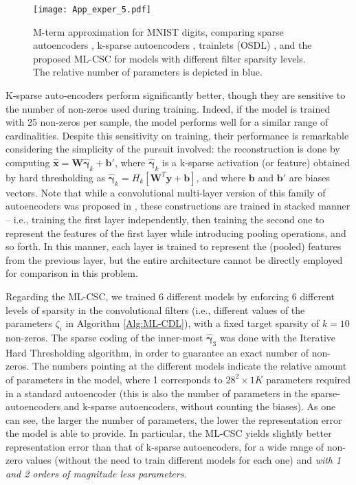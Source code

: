 \documentclass[10pt,journal]{IEEEtran}
\def\x{{\mathbf x}}
\def\y{{\mathbf y}}
\def\W{{\mathbf W}}
\def\b{{\mathbf b}}
\def\gama{{\boldsymbol \gamma}}
\theoremstyle{plain}
\theoremstyle{definition}
\begin{document}
\begin{figure}
	\begin{center}
		\texttt{[image: App\_exper\_5.pdf]}
		\caption{M-term approximation for MNIST digits, comparing sparse autoencoders \cite{ng2011sparse}, k-sparse autoencoders \cite{makhzani2013k}, trainlets (OSDL) \cite{Sulam2016}, and the proposed ML-CSC for models with different filter sparsity levels. The relative number of parameters is depicted in blue. }
		\label{fig:MtermApp}
	\end{center}
\end{figure}

K-sparse auto-encoders perform significantly better, though they are sensitive to the number of non-zeros used during training. Indeed, if the model is trained with 25 non-zeros per sample, the model performs well for a similar range of cardinalities. Despite this sensitivity on training, their performance is remarkable considering the simplicity of the pursuit involved: the reconstruction is done by computing $\hat{\x} = \W\hat{\gama}_k+\b'$, where $\hat{\gama}_k$ is a k-sparse activation (or feature) obtained by hard thresholding as $\hat{\gama}_k = H_k\left[ \W^T\y + \b \right]$, and where $\b$ and $\b'$ are biases vectors. Note that while a convolutional multi-layer version of this family of autoencoders was proposed in \cite{makhzani2015winner}, these constructions are trained in stacked manner -- i.e., training the first layer independently, then training the second one to represent the features of the first layer while introducing pooling operations, and so forth. In this manner, each layer is trained to represent the (pooled) features from the previous layer, but the entire architecture cannot be directly employed for comparison in this problem.

Regarding the ML-CSC, we trained 6 different models by enforcing 6 different levels of sparsity in the convolutional filters (i.e., different values of the parameters $\zeta_i$ in Algorithm \ref{Alg:ML-CDL}), with a fixed target sparsity of $k=10$ non-zeros. The sparse coding of the inner-most $\hat{\gama}_3$ was done with the Iterative Hard Thresholding algorithm, in order to guarantee an exact number of non-zeros. The numbers pointing at the different models indicate the relative amount of parameters in the model, where 1 corresponds to $28^2\times 1K$ parameters required in a standard autoencoder (this is also the number of parameters in the sparse-autoencoders and k-sparse autoencoders, without counting the biases). As one can see, the larger the number of parameters, the lower the representation error the model is able to provide. In particular, the ML-CSC yields slightly better representation error than that of k-sparse autoencoders, for a wide range of non-zero values (without the need to train different models for each one) and \emph{with 1 and 2 orders of magnitude less parameters}.
\end{document}

